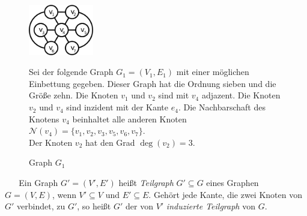\begin{figure}
\begin{minipage}{145pt}
\centering
\includegraphics*[width = 80pt]{bilder/bsp2,1.pdf}
\label{bild:bsp1}
\caption{Graph $G_1$}
\end{minipage}
\begin{minipage}{280pt}
Sei der folgende Graph $G_1=(V_1,E_1)$ mit einer möglichen Einbettung gegeben.
Dieser Graph hat die Ordnung sieben und die Größe zehn. Die Knoten $v_1$ und $v_2$ sind mit $v_4$ adjazent. Die Knoten $v_2$ und $v_4$ sind inzident mit der Kante $e_4$. Die Nachbarschaft des Knotens $v_4$ beinhaltet alle anderen Knoten $\mathcal{N}(v_4)=\{v_1,v_2,v_3,v_5,v_6,v_7\}$.\\Der Knoten $v_2$ hat den Grad $\deg(v_2)=3$. 
\end{minipage}
\end{figure}
~\linebreak
\vspace{-2mm}
~\linebreak
Ein Graph $G'=(V',E')$ heißt \emph{Teilgraph} $G'\subseteq G$ eines Graphen $G=(V,E)$, wenn $V'\subseteq V$ und $E'\subseteq E$. Gehört jede Kante, die zwei Knoten von $G'$ verbindet, zu $G'$, so heißt $G'$ der von $V'$ \emph{induzierte Teilgraph} von $G$. 
